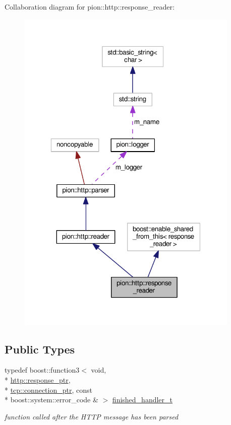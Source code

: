 Collaboration diagram for pion\-:\-:http\-:\-:response\-\_\-reader\-:
\nopagebreak
\begin{figure}[H]
\begin{center}
\leavevmode
\includegraphics[width=301pt]{classpion_1_1http_1_1response__reader__coll__graph}
\end{center}
\end{figure}
\subsection*{Public Types}
\begin{DoxyCompactItemize}
\item 
typedef boost\-::function3$<$ void, \\*
\hyperlink{namespacepion_1_1http_af92bc593f2514fe8733175dafec7cd33}{http\-::response\-\_\-ptr}, \\*
\hyperlink{namespacepion_1_1tcp_a6c9b7497068009f6d81d95ec0b0627d6}{tcp\-::connection\-\_\-ptr}, const \\*
boost\-::system\-::error\-\_\-code \& $>$ \hyperlink{classpion_1_1http_1_1response__reader_a5ca8a2f566ad6c5f6c6ae264d557944e}{finished\-\_\-handler\-\_\-t}
\begin{DoxyCompactList}\small\item\em function called after the H\-T\-T\-P message has been parsed \end{DoxyCompactList}\end{DoxyCompactItemize}

